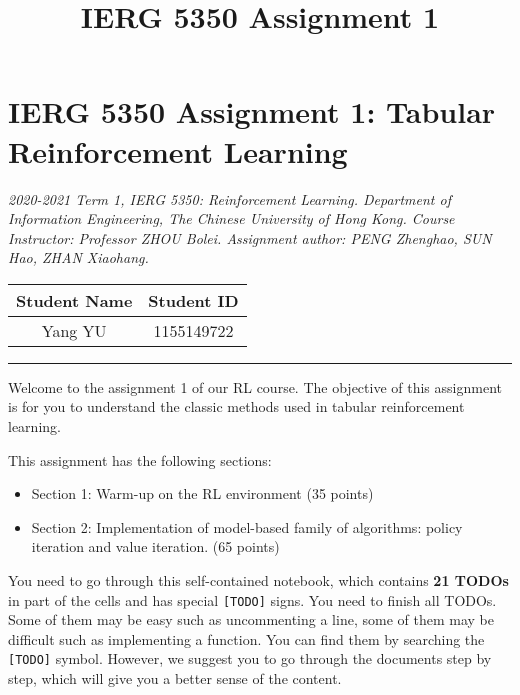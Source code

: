 \documentclass[11pt]{article}
\title{IERG 5350 Assignment 1}
\providecommand{\tightlist}{%
      \setlength{\itemsep}{0pt}\setlength{\parskip}{0pt}}
\begin{document}
    
    
    \maketitle
    
    

    
    \section{IERG 5350 Assignment 1: Tabular Reinforcement
Learning}\label{ierg-5350-assignment-1-tabular-reinforcement-learning}

\emph{2020-2021 Term 1, IERG 5350: Reinforcement Learning. Department of
Information Engineering, The Chinese University of Hong Kong. Course
Instructor: Professor ZHOU Bolei. Assignment author: PENG Zhenghao, SUN
Hao, ZHAN Xiaohang.}

    \begin{longtable}[]{@{}cc@{}}
\toprule
Student Name & Student ID\tabularnewline
\midrule
\endhead
Yang YU & 1155149722\tabularnewline
\bottomrule
\end{longtable}

\begin{center}\rule{0.5\linewidth}{\linethickness}\end{center}

    Welcome to the assignment 1 of our RL course. The objective of this
assignment is for you to understand the classic methods used in tabular
reinforcement learning.

This assignment has the following sections:

\begin{itemize}
\tightlist
\item
  Section 1: Warm-up on the RL environment (35 points)
\item
  Section 2: Implementation of model-based family of algorithms: policy
  iteration and value iteration. (65 points)
\end{itemize}

You need to go through this self-contained notebook, which contains
\textbf{21 TODOs} in part of the cells and has special
\texttt{{[}TODO{]}} signs. You need to finish all TODOs. Some of them
may be easy such as uncommenting a line, some of them may be difficult
such as implementing a function. You can find them by searching the
\texttt{{[}TODO{]}} symbol. However, we suggest you to go through the
documents step by step, which will give you a better sense of the
content.
\end{document}
